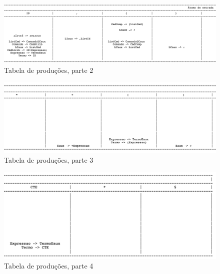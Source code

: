 \documentclass[a4paper, 10pt]{article}
\begin{document}
\begin{figure}
  \begin{center}
  \includegraphics[width=\linewidth]{./../output/quest36.png}
  \caption{Tabela de produções, parte 2}
  \label{fig:quest36}
  \end{center}
\end{figure}

\begin{figure}
  \begin{center}
  \includegraphics[width=\linewidth]{./../output/quest37.png}
  \caption{Tabela de produções, parte 3}
  \label{fig:quest37}
  \end{center}
\end{figure}

\begin{figure}
  \begin{center}
  \includegraphics[width=\linewidth]{./../output/quest38.png}
  \caption{Tabela de produções, parte 4}
  \label{fig:quest38}
  \end{center}
\end{figure}





\end{document}

